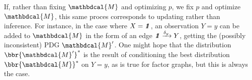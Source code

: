 \documentclass{article}
\theoremstyle{plain}
\theoremstyle{definition}
\theoremstyle{remark}
\newcommand\commentout[1]{}
\newcommand{\dg}[1]{\mathbdcal{#1}}
\newcommand{\pdgunit}{\mathrlap{\mathit 1} \mspace{2.3mu}\mathit 1}
\newcommand{\ed}[3]{%
		\mathchoice%
		{#2\overset{\smash{\mskip-5mu\raisebox{-3pt}{${#1}$}}}{\xrightarrow{\hphantom{\scriptstyle {#1}}}} #3} %
		{#2\overset{\smash{\mskip-5mu\raisebox{-3pt}{$\scriptstyle {#1}$}}}{\xrightarrow{\hphantom{\scriptstyle {#1}}}} #3}%
		{#2\overset{\smash{\mskip-5mu\raisebox{-3pt}{$\scriptscriptstyle {#1}$}}}{\xrightarrow{\hphantom{\scriptscriptstyle {#1}}}} #3} %
		{#2\overset{\smash{\mskip-5mu\raisebox{-3pt}{$\scriptscriptstyle {#1}$}}}{\xrightarrow{\hphantom{\scriptscriptstyle {#1}}}} #3}} %
\begin{document}
\commentout{
	If, rather than fixing $\dg M$ and optimizing $p$, we fix $p$ and optimize $\dg M$,
	this same proces corresponds to an update, rather than an inference. For instance, in
	the case where $X = \pdgunit$, an observation $Y\!=\!y$  can be added to
	$\dg M$ in the form of an edge $\ed{\delta_y}{\pdgunit}Y$, getting the
	(possibly inconsistent) PDG $\dg M'$. The distribution $\bbr{M'}^*$ turns out
	to be the result of conditioning $\bbr{\dg M}^*$ on $Y\!=\!y$.
}
If, rather than fixing $\dg M$ and optimizing $p$, we fix $p$ and optimize $\dg M$,
this same proces corresponds to updating rather than inference. For instance, in
the case where $X = \pdgunit$, an observation $Y\!=\!y$  can be added to
$\dg M$ in the form of an edge $\ed{\delta_y}{\pdgunit}Y$, getting the
(possibly inconsistent) PDG $\dg M'$. One might hope that the distribution
$\bbr{\dg M'}^*$ is the result of conditioning the best distribution $\bbr{\dg M}^*$ on $Y\!=\!y$, as is true for factor graphs, but this is always the case.
\end{document}
